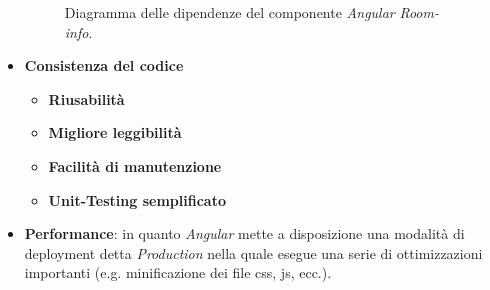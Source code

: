 \begin{itemize}
\begin{figure}
        \caption{Diagramma delle dipendenze del componente \textit{Angular} \textit{Room-info}.}
        \label{fig:angular-room-info-component-dependencies-diagram}
    \end{figure}
    \item \textbf{Consistenza del codice} 
        \begin{itemize}
         \item \textbf{Riusabilità}
         \item \textbf{Migliore leggibilità}
         \item \textbf{Facilità di manutenzione}
         \item \textbf{Unit-Testing semplificato}
        \end{itemize}
    \item \textbf{Performance}: in quanto \textit{Angular} mette a disposizione una modalità di deployment detta \textit{Production} nella quale esegue una serie di ottimizzazioni importanti (e.g. minificazione dei file css, js, ecc.).
\end{itemize}
